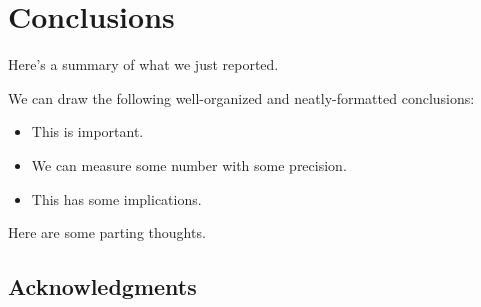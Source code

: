 \documentclass[\docopts]{\docclass}
\begin{document}
\section{Conclusions}
\label{sec:conclusions}

Here's a summary of what we just reported.

We can draw the following well-organized and neatly-formatted conclusions:
\begin{itemize}
  \item This is important.
  \item We can measure some number with some precision.
  \item This has some implications.
\end{itemize}

Here are some parting thoughts.



\subsection*{Acknowledgments}





\end{document}
